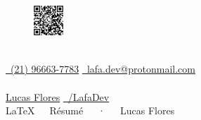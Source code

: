 \documentclass[11pt, a4paper]{awesome-cv}
\begin{document}
\newline
\makecvheader[L]
\begin{figure}
  \begin{center}
    \href{https://wa.me/message/RU5FTPQFDK3MA1}{\includegraphics[width=0.10\textwidth]{QRcode4.jpg}}
  \end{center}
\end{figure}
\\
\href{tel:21966637783}{\faPhone\acvHeaderIconSep\ (21) 96663-7783}
\hspace{0.5cm}
\href{mailto:lafa.dev@protonmail.com}{\faEnvelope\acvHeaderIconSep\ lafa.dev@protonmail.com}
\hspace{0.5cm}
\\
\\
\href{https://www.linkedin.com/in/lafa}{\faLinkedinSquare\acvHeaderIconSep\@ Lucas Flores}
\hspace{1.1cm}
\href{https://github.com/LafaDev}{\faGithubSquare\acvHeaderIconSep\ /LafaDev}
\hspace{2cm}
\\


\makecvfooter
  {}
  {\LaTeX~~~Résumé~~~·~~~Lucas Flores}
  {}








\end{document}
